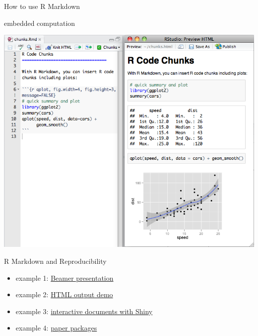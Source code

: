\documentclass[ignorenonframetext,]{beamer}
\begin{document}
\begin{frame}{How to use R Markdown}

\begin{block}{embedded computation}

\includegraphics{images/markdownChunk.png}

\end{block}

\end{frame}

\begin{frame}{R Markdown and Reproducibility}

\begin{itemize}[<+->]
\itemsep1pt\parskip0pt
\item
  example 1:
  \href{https://github.com/cainesap/replication/blob/master/slides.Rmd}{Beamer
  presentation}
\item
  example 2:
  \href{https://raw.githubusercontent.com/cainesap/replication/master/html_doc.Rmd}{HTML
  output demo}
\item
  example 3:
  \href{https://raw.githubusercontent.com/cainesap/replication/master/shiny_doc.Rmd}{interactive
  documents with Shiny}
\item
  example 4:
  \href{http://openscience.uni-leipzig.de/index.php/mr2/article/view/41}{paper
  packages}
\end{itemize}

\end{frame}
\end{document}
